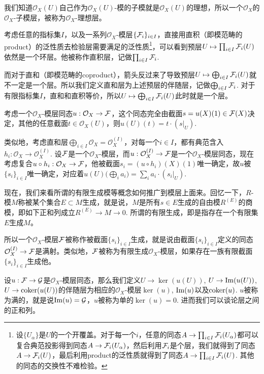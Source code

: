 我们知道$\mathcal{O}_X(U)$自己作为$\mathcal{O}_X(U)$-模的子模就是$\mathcal{O}_X(U)$的理想，所以一个$\mathcal{O}_X$的$\mathcal{O}_X$-子模层，被称为$\mathcal{O}_X$-理想层。

\para 考虑任意的指标集$I$，以及一系列$\mathcal{O}_X$-模层$\{\mathcal{F}_i\}_{i\in I}$，直接用直积（即模范畴的product）的泛性质去检验层需要满足的泛性质\footnote{设$\{U_\alpha\}$是$U$的一个开覆盖。对于每一个$i$，任意的同态$A\to \prod_{i\in I}\mathcal{F}_i(U_\alpha)$都可以复合典范投影得到同态$A\to \mathcal{F}_i(U_\alpha)$，然后利用$\mathcal{F}_i$是个层，我们就得到了同态$A\to \mathcal{F}_i(U)$，最后利用product的泛性质就得到了同态$A\to \prod_{i\in I}\mathcal{F}_i(U)$. 其他的同态的交换性不难检验。}，可以看到预层$U\mapsto \prod_{i\in I}\mathcal{F}_i(U)$依然是一个环层。他被称作直积层，记做$\prod_{i\in I}\mathcal{F}_i$.

而对于直和（即模范畴的coproduct），箭头反过来了导致预层$U\mapsto \bigoplus_{i\in I}\mathcal{F}_i(U)$就不一定是一个层。所以我们定义直和层为上述预层的伴随层，记做$\bigoplus_{i\in I}\mathcal{F}_i$. 对于有限指标集$I$，直和和直积等价，所以$U\mapsto \bigoplus_{i\in I}\mathcal{F}_i(U)$此时就是一个层。

\para 考虑一个$\mathcal{O}_X$-模层同态$u:\mathcal{O}_X\to \mathcal{F}$，这个同态完全由截面$s=u(X)(1)\in \mathcal{F}(X)$决定，其他的任意截面$t\in \mathcal{O}_X(U)$，则$u(U)(t)=t\cdot (s|_U)$.

类似地，考虑直和层$\bigoplus_{i\in I}\mathcal{O}_X=\mathcal{O}_X^{(I)}$，对每一个$i\in I$，都有典范含入$h_i:\mathcal{O}_X\to \mathcal{O}_X^{(I)}$. 设$\mathcal{F}$是一个$\mathcal{O}_X$-模层，而$u:\mathcal{O}_X^{(I)}\to \mathcal{F}$是一个$\mathcal{O}_X$-模层同态，现在考虑复合$u\circ h_i:\mathcal{O}_X\to \mathcal{F}$，他被截面$s_i=(u\circ h_i)(X)(1)$唯一确定，故$u$被$\{s_i\}_{i\in I}$唯一确定，对应着$u(U)\bigl(\bigoplus_i a_i\bigr)=\sum_i a_i\cdot (s_i|_U)$.

\para 现在，我们来看所谓的有限生成模等概念如何推广到模层上面来。回忆一下，$R$-模$M$称被某个集合$E\subset M$生成，就是说，$M$是所有$s\in E$生成的自由模$R^{(E)}$的商模，即如下正和列成立$R^{(E)}\to M \to 0$. 所谓的有限生成，即是指存在一个有限集$E$生成$M$。

所以一个$\mathcal{O}_X$-模层$\mathcal{F}$被称作被截面$\{s_i\}_{i\in I}$生成，就是说由截面$\{s_i\}_{i\in I}$定义的同态$\mathcal{O}_X^{(I)}\to \mathcal{F}$是满射。类似地，$\mathcal{F}$被称为有限生成$\mathcal{O}_X$-模层，如果存在一族有限截面$\{s_i\}_{i\in I}$生成他。

\para 设$u:\mathcal{F}\to \mathcal{G}$是$\mathcal{O}_X$-模层同态，那么我们定义$U\to \ker(u(U))$, $U\to \operatorname{Im}(u(U))$, $U\to \operatorname{coker}(u(U))$的伴随层为相应的$\mathcal{O}_X$-模层$\ker(u)$, $\operatorname{Im}(u)$以及$\operatorname{coker}(u)$. $u$被称为满的，就是说$\operatorname{Im}(u)=\mathcal{G}$，$u$被称为单的$\ker(u)=0$. 进而我们可以谈论层之间的正和列。

